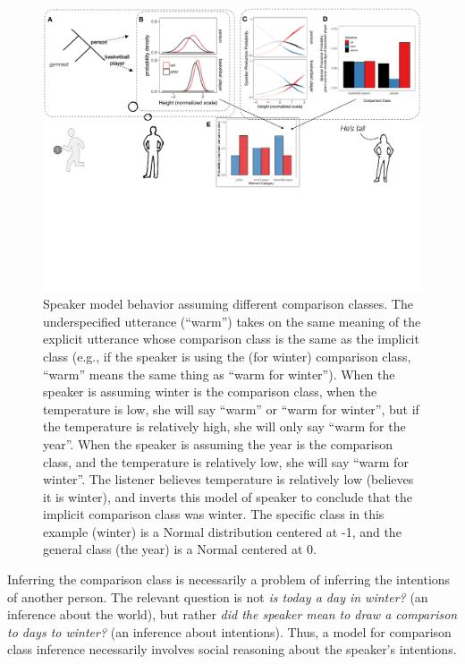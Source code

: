 \documentclass[doc]{apa6}
\begin{document}
\begin{figure}
\centering
\includegraphics[width=\textwidth]{figs/model_cartoon.pdf}
\caption{\label{fig:speakerSimulations}Speaker model behavior assuming
different comparison classes. The underspecified utterance
(``warm'') takes on the same meaning of the explicit utterance
whose comparison class is the same as the implicit class (e.g., if the
speaker is using the (for winter) comparison class, ``warm'' means
the same thing as ``warm for winter''). When the speaker is
assuming winter is the comparison class, when the temperature is low, she
will say ``warm'' or ``warm for winter'', but if the
temperature is relatively high, she will only say ``warm for the
year''. When the speaker is assuming the year is the comparison class,
and the temperature is relatively low, she will say ``warm for
winter''. The listener believes temperature is relatively low (believes
it is winter), and inverts this model of speaker to conclude that the
implicit comparison class was winter. The specific class in this example
(winter) is a Normal distribution centered at -1, and the general class
(the year) is a Normal centered at 0.}
\end{figure}

Inferring the comparison class is necessarily a problem of inferring the intentions of another person.
The relevant question is not \emph{is today a day in winter?} (an inference about the world), but rather \emph{did the speaker mean to draw a comparison to days to winter?} (an inference about intentions).
Thus, a model for comparison class inference necessarily involves social reasoning about the speaker's intentions.
\end{document}
